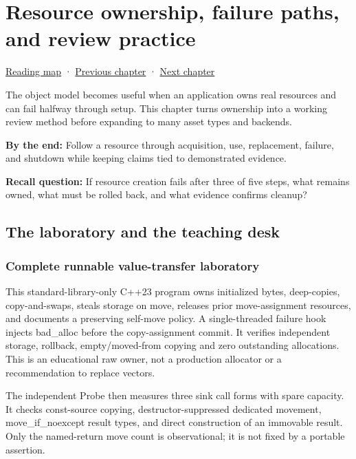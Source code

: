\hypertarget{05-engine-i-ch004}{}
\chapter{Resource ownership, failure paths, and review practice}\label{stagechapter:05-engine-i-ch004}\label{05-engine-i-ch004-resource-ownership-failure-paths-and-review-practice}

\hyperref[volume-reading-map]{Reading map} · \hyperref[05-engine-i-ch003-object-representation-lifetime-and-enforceable-promises]{Previous chapter} · \hyperref[05-engine-i-ch005-generic-asset-pipelines-with-stable-identity]{Next chapter}

The object model becomes useful when an application owns real resources and can fail halfway through setup. This chapter turns ownership into a working review method before expanding to many asset types and backends.

\textbf{By the end:} Follow a resource through acquisition, use, replacement, failure, and shutdown while keeping claims tied to demonstrated evidence.

\textbf{Recall question:} If resource creation fails after three of five steps, what remains owned, what must be rolled back, and what evidence confirms cleanup?

\section{The laboratory and the teaching desk}\label{05-engine-i-ch004-the-laboratory-and-the-teaching-desk}

\subsection{Complete runnable value-transfer laboratory}\label{05-engine-i-ch004-complete-runnable-value-transfer-laboratory}

This standard-library-only C++23 program owns initialized bytes, deep-copies, copy-and-swaps, steals storage on move, releases prior move-assignment resources, and documents a preserving self-move policy. A single-threaded failure hook injects bad\_alloc before the copy-assignment commit. It verifies independent storage, rollback, empty/moved-from copying and zero outstanding allocations. This is an educational raw owner, not a production allocator or a recommendation to replace vectors.

The independent Probe then measures three sink call forms with spare capacity. It checks const-source copying, destructor-suppressed dedicated movement, move\_if\_noexcept result types, and direct construction of an immovable result. Only the named-return move count is observational; it is not fixed by a portable assertion.

